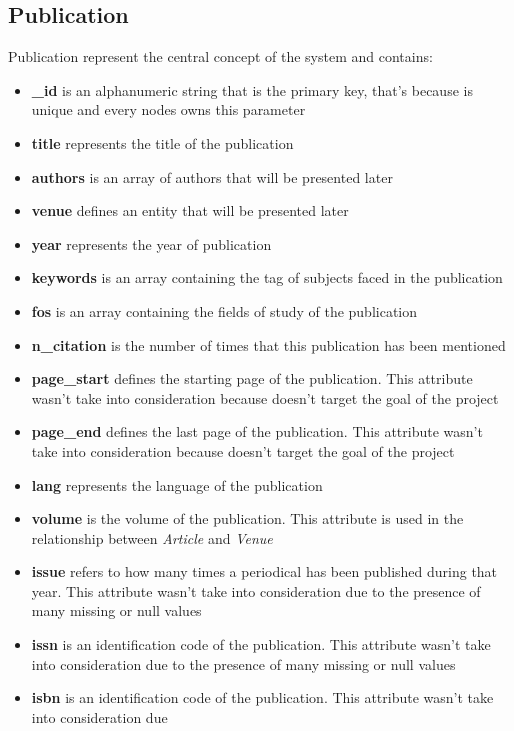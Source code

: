\documentclass{Configuration_Files/PoliMi3i_thesis}
\begin{document}
\subsection{Publication}
Publication represent the central concept of the system and contains:
\begin{itemize}
    \item \textbf{\_id} is an alphanumeric string that is the primary key, that's because is unique and every
            nodes owns this parameter
    \item \textbf{title} represents the title of the publication
    \item \textbf{authors} is an array of authors that will be presented later
    \item \textbf{venue} defines an entity that will be presented later
    \item \textbf{year} represents the year of publication
    \item \textbf{keywords} is an array containing the tag of subjects faced in the publication
    \item \textbf{fos} is an array containing the fields of study of the publication
    \item \textbf{n\_citation} is the number of times that this publication has been mentioned
    \item \textbf{page\_start} defines the starting page of the publication. This attribute wasn't take into consideration
            because doesn't target the goal of the project
    \item \textbf{page\_end} defines the last page of the publication. This attribute wasn't take into consideration
            because doesn't target the goal of the project
    \item \textbf{lang} represents the language of the publication
    \item \textbf{volume} is the volume of the publication. This attribute is used in the relationship between \emph{Article}
            and \emph{Venue}
    \item \textbf{issue} refers to how many times a periodical has been published during that year. This attribute 
            wasn't take into consideration due to the presence of many missing or null values
    \item \textbf{issn} is an identification code of the publication. This attribute wasn't take into consideration due
            to the presence of many missing or null values
    \item \textbf{isbn} is an identification code of the publication. This attribute wasn't take into consideration due

\end{itemize}
\end{document}
